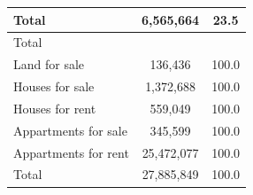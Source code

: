\begin{table}[htbp]
\begin{tabular}{l*{1}{cc}}
Total       &   6,565,664&        23.5\\
\midrule
Total       &            &            \\
Land for sale&     136,436&       100.0\\
Houses for sale&   1,372,688&       100.0\\
Houses for rent&     559,049&       100.0\\
Appartments for sale&     345,599&       100.0\\
Appartments for rent&  25,472,077&       100.0\\
Total       &  27,885,849&       100.0\\
\bottomrule
\end{tabular}
\end{table}

